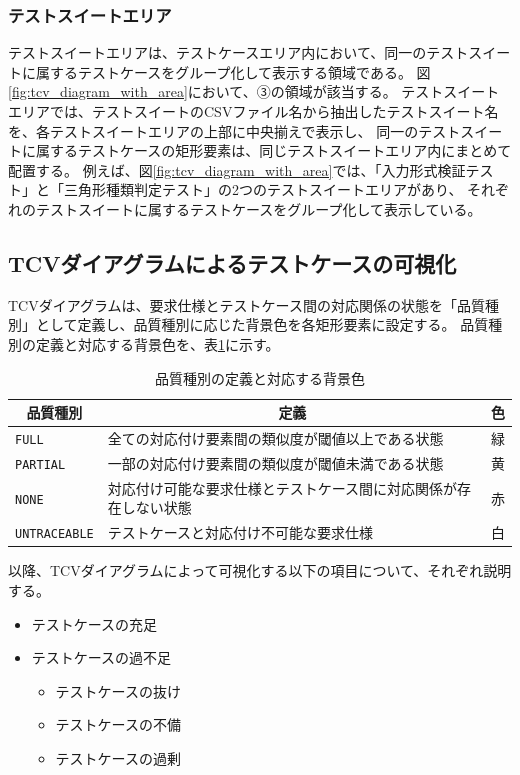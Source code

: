 \subsubsection{テストスイートエリア}\label{subsec:testsuite_area}
テストスイートエリアは、テストケースエリア内において、同一のテストスイートに属するテストケースをグループ化して表示する領域である。
図\ref{fig:tcv_diagram_with_area}において、③の領域が該当する。
テストスイートエリアでは、テストスイートのCSVファイル名から抽出したテストスイート名を、各テストスイートエリアの上部に中央揃えで表示し、
同一のテストスイートに属するテストケースの矩形要素は、同じテストスイートエリア内にまとめて配置する。
例えば、図\ref{fig:tcv_diagram_with_area}では、「入力形式検証テスト」と「三角形種類判定テスト」の2つのテストスイートエリアがあり、
それぞれのテストスイートに属するテストケースをグループ化して表示している。

\subsection{TCVダイアグラムによるテストケースの可視化}\label{subsec:tcv_visualization}
TCVダイアグラムは、要求仕様とテストケース間の対応関係の状態を「品質種別」として定義し、品質種別に応じた背景色を各矩形要素に設定する。
品質種別の定義と対応する背景色を、表\ref{tab:quality_type}に示す。

\begin{table}[tp]
    \caption{品質種別の定義と対応する背景色}\label{tab:quality_type}
    \centering
    \begin{tabular}{l|l|l}
        \multicolumn{1}{c|}{品質種別} & \multicolumn{1}{c|}{定義} & \multicolumn{1}{c}{色} \\
        \hline
        \hline
        \texttt{FULL} & 全ての対応付け要素間の類似度が閾値以上である状態 & 緑 \\
        \hline
        \texttt{PARTIAL} & 一部の対応付け要素間の類似度が閾値未満である状態 & 黄 \\
        \hline
        \texttt{NONE} & 対応付け可能な要求仕様とテストケース間に対応関係が存在しない状態 & 赤 \\
        \hline
        \texttt{UNTRACEABLE} & テストケースと対応付け不可能な要求仕様 & 白 \\
        \hline
    \end{tabular}
\end{table}

以降、TCVダイアグラムによって可視化する以下の項目について、それぞれ説明する。

\begin{itemize}
    \item テストケースの充足
    \item テストケースの過不足
    \begin{itemize}
        \item テストケースの抜け
        \item テストケースの不備
        \item テストケースの過剰
    \end{itemize}
\end{itemize}

